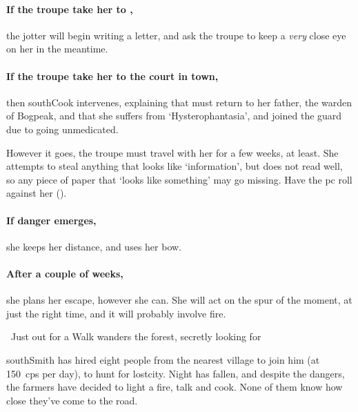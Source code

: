\paragraph{If the troupe take her to ,}
the \gls{jotter} will begin writing a letter, and ask the troupe to keep a \textit{very} close eye on her in the meantime.

\paragraph{If the troupe take her to the \gls{court} in \gls{town},}
then \gls{southCook} intervenes, explaining that  must return to her father, the \gls{warden} of Bogpeak, and that she suffers from `Hysterophantasia', and joined the \gls{guard} due to going unmedicated.

However it goes, the troupe must travel with her for a few weeks, at least.
She attempts to steal anything that looks like `information', but does not read well, so any piece of paper that `looks like something' may go missing.
Have the \gls{pc} roll  against her  (\tn).

\paragraph{If danger emerges,}
she keeps her distance, and uses her bow.

\paragraph{After a couple of weeks,}
she plans her escape, however she can.
She will act on the spur of the moment, at just the right time, and it will probably involve fire.

\southRogue
\label{southRogue}

{~Just out for a Walk}%
{ wanders the forest, secretly looking for }%

\begin{exampletext}
  \Gls{southSmith} has hired eight people from the nearest \gls{village} to join him (at 150~\glspl{cp} per day), to hunt for \gls{lostcity}.
  Night has fallen, and despite the dangers, the farmers have decided to light a fire, talk and cook.
  None of them know how close they've come to the road.
\end{exampletext}

